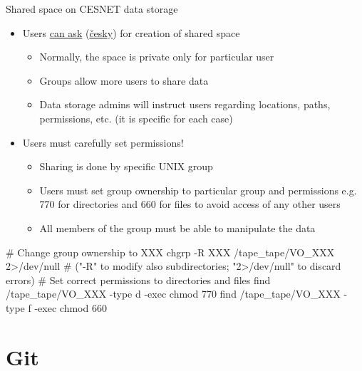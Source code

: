 \documentclass[compress, ucs, xelatex, 11pt, xcolor=svgnames, aspectratio=169,
	hyperref={
		bookmarks=true,
		unicode=true,
		colorlinks=true,
		pdftitle={Linux, command line and MetaCentrum},
		plainpages=false,
		pdfauthor={Vojtech Zeisek},
		pdfsubject={Course about use of Linux command line, writing shell scripts and using MetaCentrum of CESNET},
		pdfcreator={XeLaTeX},
		pdfkeywords={Linux, GNU, BASH, shell, command line, MetaCentrum},
		linkcolor=DarkRed, %
		anchorcolor=DarkBlue, %
		citecolor=Indigo, %
		filecolor=NavyBlue, %
		menucolor=DarkMagenta, %
		urlcolor=DarkBlue, %
		pdftex},
	url={hyphens, lowtilde} %
	]{beamer}
\begin{document}
\begin{frame}[fragile]{Shared space on CESNET data storage}
	\begin{itemize}
		\item Users \href{https://du.cesnet.cz/en/uzivatelska_podpora/start}{can ask} (\href{https://du.cesnet.cz/cs/uzivatelska_podpora/start}{česky}) for creation of shared space
		\begin{itemize}
			\item Normally, the space is private only for particular user
			\item Groups allow more users to share data
			\item Data storage admins will instruct users regarding locations, paths, permissions, etc. (it is specific for each case)
		\end{itemize}
		\item Users must carefully set permissions!
		\begin{itemize}
			\item Sharing is done by specific UNIX group
			\item Users must set group ownership to particular group and permissions e.g. 770 for directories and 660 for files to avoid access of any other users
			\item All members of the group must be able to manipulate the data
		\end{itemize}
	\end{itemize}
	\vfill
	\begin{bashcode}
    # Change group ownership to XXX
    chgrp -R XXX /tape_tape/VO_XXX 2>/dev/null
    # ("-R" to modify also subdirectories; "2>/dev/null" to discard errors)
    # Set correct permissions to directories and files
    find /tape_tape/VO_XXX -type d -exec chmod 770 {} \;
    find /tape_tape/VO_XXX -type f -exec chmod 660 {} \;
	\end{bashcode}
\end{frame}

%

\section{Git}
\end{document}
